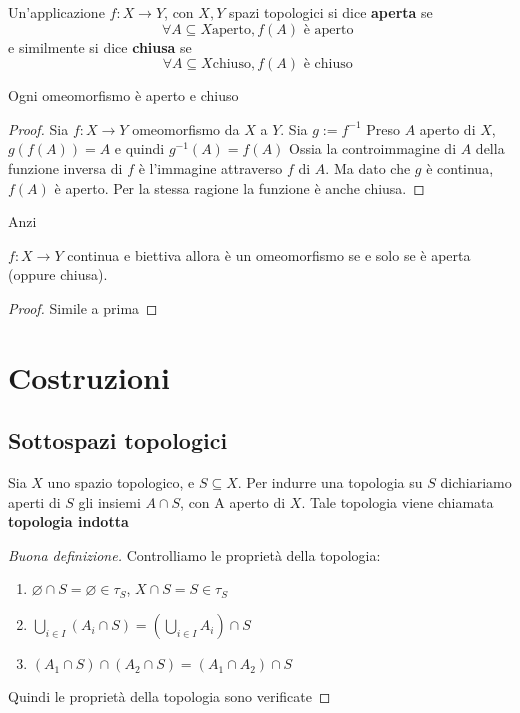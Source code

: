 \begin{definition}
    Un'applicazione \(f: X \to Y\), con \(X, Y\) spazi topologici si dice
    \textbf{aperta} se
    \[
        \forall A \subseteq  X \text{aperto}, f(A) \text{ è aperto }
    \]
    e similmente si dice \textbf{chiusa} se
    \[
        \forall A \subseteq  X \text{chiuso}, f(A) \text{ è chiuso }
    \]
\end{definition}
\begin{proposition}
    Ogni omeomorfismo è aperto e chiuso
\end{proposition}
\begin{proof}
    Sia \(f: X \to Y\) omeomorfismo da \(X\) a \(Y\). Sia \(g := f^{-1}\)
    Preso \(A\) aperto di \(X\), \(g(f(A)) = A\) e quindi \(g^{-1}(A) = f(A)\)
    Ossia la controimmagine di \(A\) della funzione inversa di \(f\) è
    l'immagine attraverso \(f\) di \(A\). Ma dato che \(g\) è continua, \(f(A)\)
    è aperto. Per la stessa ragione la funzione è anche chiusa.
\end{proof}
Anzi
\begin{proposition}
    \(f: X \to Y\) continua e biettiva allora è un omeomorfismo se e solo se è
    aperta (oppure chiusa).
\end{proposition}
\begin{proof}
    Simile a prima
\end{proof}

\section{Costruzioni}
\subsection{Sottospazi topologici}
\begin{definition}
Sia \(X\) uno spazio topologico, e \(S \subseteq  X\). Per indurre una topologia
su \(S\) dichiariamo aperti di \(S\) gli insiemi \(A \cap  S\), con A aperto di
\(X\). Tale topologia viene chiamata \textbf{topologia indotta}
\end{definition}
\begin{proof}[Buona definizione] Controlliamo le proprietà della topologia:
\begin{enumerate}[label = \arabic*)]
    \item \(\varnothing \cap S = \varnothing \in \tau_S\), \(X \cap  S = S \in
        \tau_S\) 
    \item \(\bigcup_{i \in I} (A_{i} \cap S) = \left(\bigcup_{i \in  I}
            A_{i}\right) \cap S\) 
    \item \((A_{1}\cap S) \cap (A_{2} \cap S) = (A_{1} \cap A_{2}) \cap S\) 
\end{enumerate}
Quindi le proprietà della topologia sono verificate
\end{proof}

